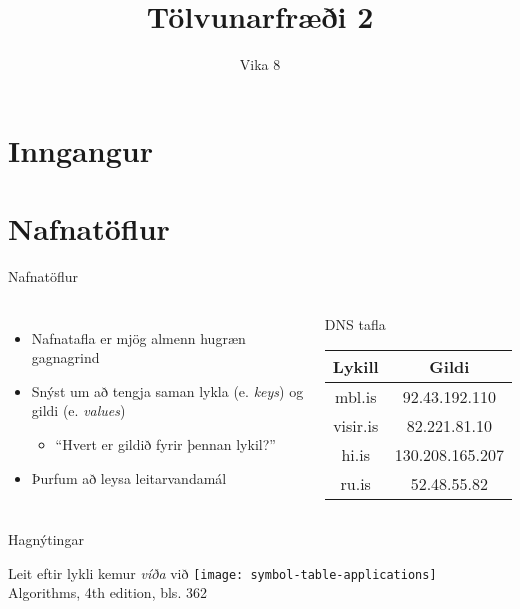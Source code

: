 \documentclass{beamer}
\title{Tölvunarfræði 2}
\subtitle{Vika 8}
\begin{document}
\begin{frame}
	\titlepage
\end{frame}

\section{Inngangur}

\section{Nafnatöflur}

\begin{frame}{Nafnatöflur}
	\begin{columns}
		\begin{itemize}
			\item Nafnatafla  er mjög almenn hugræn gagnagrind
			\item Snýst um að tengja saman lykla (e. \emph{keys}) og gildi (e. \emph{values})
			      \begin{itemize}
				      \item ``Hvert er gildið fyrir þennan lykil?''
			      \end{itemize}
			\item Þurfum að leysa leitarvandamál
		\end{itemize}
		\begin{center}
			DNS tafla
			\begin{tabular}{cc}
				\toprule
				Lykill   & Gildi           \\
				\midrule
				mbl.is   & 92.43.192.110   \\
				visir.is & 82.221.81.10    \\
				hi.is    & 130.208.165.207 \\
				ru.is    & 52.48.55.82     \\
				\bottomrule
			\end{tabular}
		\end{center}
	\end{columns}
\end{frame}

\begin{frame}{Hagnýtingar}
    \begin{center}
        Leit eftir lykli kemur \emph{víða} við
        \vspace{0.5cm}
        \texttt{[image: symbol-table-applications]}
        \vspace{0.5cm}
        Algorithms, 4th edition, bls. 362
    \end{center}
\end{frame}
\end{document}
